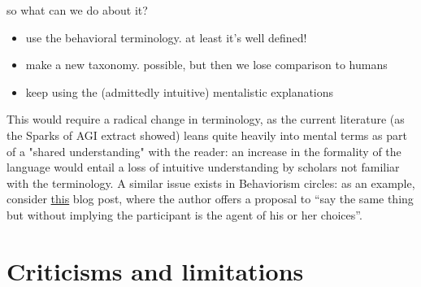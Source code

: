 \documentclass[letterpaper,11pt,twocolumn]{article}
\begin{document}
so what can we do about it?
\begin{itemize}
    \item use the behavioral terminology. at least it's well defined!
    \item make a new taxonomy. possible, but then we lose comparison to humans
    \item keep using the (admittedly intuitive) mentalistic explanations
\end{itemize}
This would require a radical change in terminology, as the current literature (as the Sparks of AGI \cite{bubeckSparksArtificialGeneral2023} extract showed) leans quite heavily into mental terms as part of a "shared understanding" with the reader: an increase in the formality of the language would entail a loss of intuitive understanding by scholars not familiar with the terminology. A similar issue exists in Behaviorism circles: as an example, consider \href{https://abatechnologies.com/blog/behavior-analysiss-not-so-secret-agent}{this} blog post\cite{lattalBehaviorAnalysisNotSoSecret2020}, where the author offers a proposal to \enquote{say the same thing but without implying the participant is the agent of his or her choices}.


\section*{Criticisms and limitations}
\end{document}
